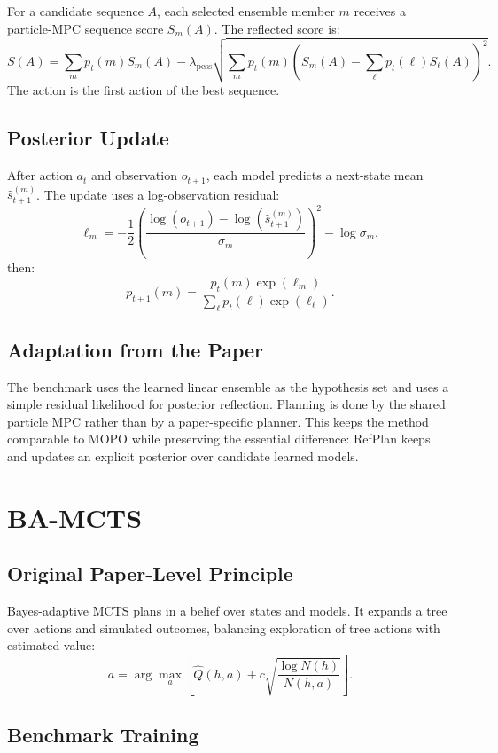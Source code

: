 \documentclass[11pt]{article}
\newcommand{\1}{\mathbf{1}}
\begin{document}
For a candidate sequence $A$, each selected ensemble member $m$ receives a
particle-MPC sequence score $S_m(A)$.  The reflected score is:
\[
  S(A)
  =
  \sum_m p_t(m)S_m(A)
  -
  \lambda_{\mathrm{pess}}
  \sqrt{\sum_m p_t(m)\left(S_m(A)-\sum_\ell p_t(\ell)S_\ell(A)\right)^2}.
\]
The action is the first action of the best sequence.

\subsection{Posterior Update}

After action $a_t$ and observation $o_{t+1}$, each model predicts a next-state
mean $\hat{s}_{t+1}^{(m)}$.  The update uses a log-observation residual:
\[
  \ell_m
  =
  -\frac{1}{2}\left(
    \frac{\log(o_{t+1})-\log(\hat{s}_{t+1}^{(m)})}{\sigma_m}
  \right)^2-\log\sigma_m,
\]
then:
\[
  p_{t+1}(m)=
  \frac{p_t(m)\exp(\ell_m)}
       {\sum_\ell p_t(\ell)\exp(\ell_\ell)}.
\]

\subsection{Adaptation from the Paper}

The benchmark uses the learned linear ensemble as the hypothesis set and uses a
simple residual likelihood for posterior reflection.  Planning is done by the
shared particle MPC rather than by a paper-specific planner.  This keeps the
method comparable to MOPO while preserving the essential difference: RefPlan
keeps and updates an explicit posterior over candidate learned models.

\section{BA-MCTS}

\subsection{Original Paper-Level Principle}

Bayes-adaptive MCTS plans in a belief over states and models.  It expands a tree
over actions and simulated outcomes, balancing exploration of tree actions with
estimated value:
\[
  a=\arg\max_a
  \left[
    \hat{Q}(h,a)+c\sqrt{\frac{\log N(h)}{N(h,a)}}
  \right].
\]

\subsection{Benchmark Training}
\end{document}
